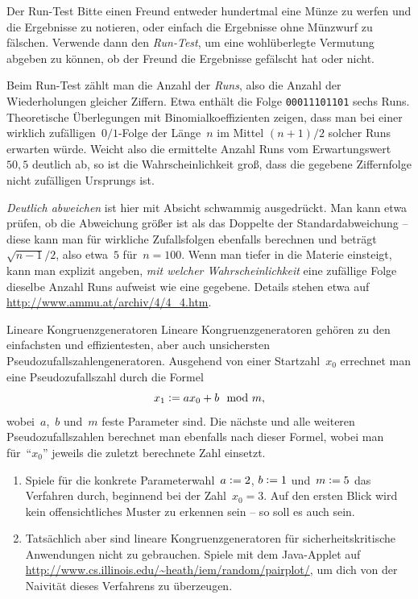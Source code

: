 \documentclass{../zirkelblatt}
\newcommand{\defeq}{\vcentcolon=}
\begin{document}
\begin{aufgabeShaded}{Der Run-Test}
Bitte einen Freund entweder hundertmal eine Münze zu werfen und die
Ergebnisse zu notieren, oder einfach die Ergebnisse ohne Münzwurf zu fälschen.
Verwende dann den \emph{Run-Test}, um eine wohlüberlegte Vermutung abgeben zu können,
ob der Freund die Ergebnisse gefälscht hat oder nicht.

Beim Run-Test zählt man die Anzahl der \emph{Runs}, also die Anzahl der Wiederholungen
gleicher Ziffern. Etwa enthält die Folge \texttt{00011101101} sechs Runs.
Theoretische Überlegungen mit Binomialkoeffizienten zeigen, dass man bei einer
wirklich zufälligen~$0/1$-Folge der Länge~$n$ im Mittel $(n+1)/2$ solcher Runs
erwarten würde. Weicht also die ermittelte Anzahl Runs vom
Erwartungswert~$50{,}5$ deutlich ab, so ist die Wahrscheinlichkeit groß, dass
die gegebene Ziffernfolge nicht zufälligen Ursprungs ist.

\emph{Deutlich abweichen} ist hier mit Absicht schwammig ausgedrückt. Man kann
etwa prüfen, ob die Abweichung größer ist als das Doppelte der Standardabweichung
-- diese kann man für wirkliche Zufallsfolgen ebenfalls berechnen und
beträgt~$\sqrt{n-1}/2$, also etwa~$5$ für~$n = 100$. Wenn man tiefer in die Materie einsteigt, kann man explizit
angeben, \emph{mit welcher Wahrscheinlichkeit} eine zufällige Folge dieselbe
Anzahl Runs aufweist wie eine gegebene. Details stehen etwa auf
\url{http://www.ammu.at/archiv/4/4_4.htm}.
\end{aufgabeShaded}

\begin{aufgabeShaded}{Lineare Kongruenzgeneratoren}
Lineare Kongruenzgeneratoren gehören zu den einfachsten und effizientesten,
aber auch unsichersten Pseudozufallszahlengeneratoren. Ausgehend von einer
Startzahl~$x_0$ errechnet man eine Pseudozufallszahl durch die Formel
\[ x_1 \defeq ax_0 + b \mod m, \]
wobei~$a$,~$b$ und~$m$ feste Parameter sind. Die nächste und alle weiteren
Pseudozufallszahlen berechnet man ebenfalls nach dieser Formel, wobei man
für~"`$x_0$"' jeweils die zuletzt berechnete Zahl einsetzt.
\begin{enumerate}
\item Spiele für die konkrete Parameterwahl~$a \defeq 2$, $b \defeq 1$ und~$m \defeq 5$ das
Verfahren durch, beginnend bei der Zahl~$x_0 = 3$. Auf den ersten Blick wird kein
offensichtliches Muster zu erkennen sein -- so soll es auch sein.
\item Tatsächlich aber sind lineare Kongruenzgeneratoren für
sicherheitskritische Anwendungen nicht zu gebrauchen. Spiele mit dem Java-Applet auf
\url{http://www.cs.illinois.edu/~heath/iem/random/pairplot/}, um dich von der
Naivität dieses Verfahrens zu überzeugen.
\end{enumerate}
\end{aufgabeShaded}
\end{document}
